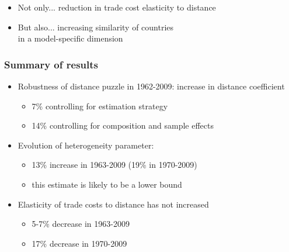 \documentclass{beamer}
\begin{document}
\begin{frame}[plain]
\begin{itemize}
\begin{itemize}
\item Not only... reduction in trade cost elasticity to distance
\item But also... increasing similarity of countries \\
\hspace{1.5cm} in a model-specific dimension
\end{itemize}
\end{itemize}
\end{frame}

\begin{frame}[plain]\frametitle{Summary of results}
\vspace{0.3cm}
\begin{itemize}
\item Robustness of distance puzzle in 1962-2009: increase in distance coefficient 
\begin{itemize}
\item 7\% controlling for estimation strategy
\item 14\% controlling for composition and sample effects
\end{itemize}
\vspace{0.3cm}
\item Evolution of heterogeneity parameter:
\begin{itemize}
\item 13\% increase in 1963-2009 (19\% in 1970-2009)
\item this estimate is likely to be a lower bound 
\end{itemize}
\vspace{0.3cm}
\item Elasticity of trade costs to distance has not increased
\begin{itemize}
\item 5-7\% decrease in 1963-2009
\item 17\% decrease in 1970-2009 

\end{itemize}
\end{itemize}
\end{frame}
\end{document}
